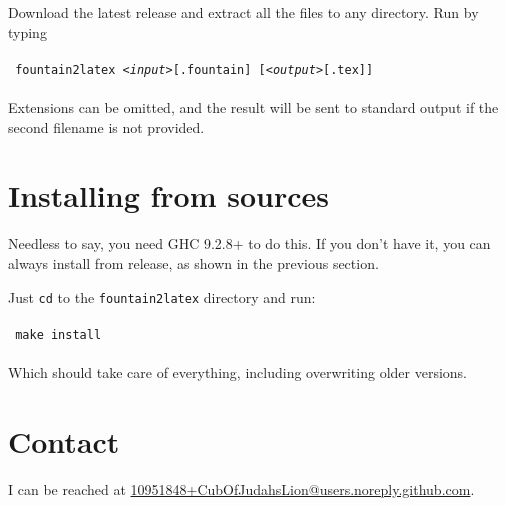 \documentclass[11pt]{article}
\newcommand{\link}[2]{\textcolor{Blue}{\href{#1}{#2}}}
\begin{document}
Download the latest release and extract all the files to any directory.
Run by typing\\
\\
\texttt{    fountain2latex \emph{<input>}[.fountain] [\emph{<output>}[.tex]]}\\
\\
Extensions can be omitted, and the result will be sent to standard
output if the second filename is not provided.


\section*{Installing from sources}

Needless to say, you need GHC 9.2.8+ to do this. If you don't have it,
you can always install from release, as shown in the previous section.

Just \texttt{cd} to the \texttt{fountain2latex} directory and run:\\
\\
\texttt{    make install}\\
\\
Which should take care of everything, including overwriting older
versions.


\section*{Contact}

I can be reached at \link{mailto:10951848+CubOfJudahsLion@users.noreply.github.com}{10951848+CubOfJudahsLion@users.noreply.github.com}.
\end{document}
